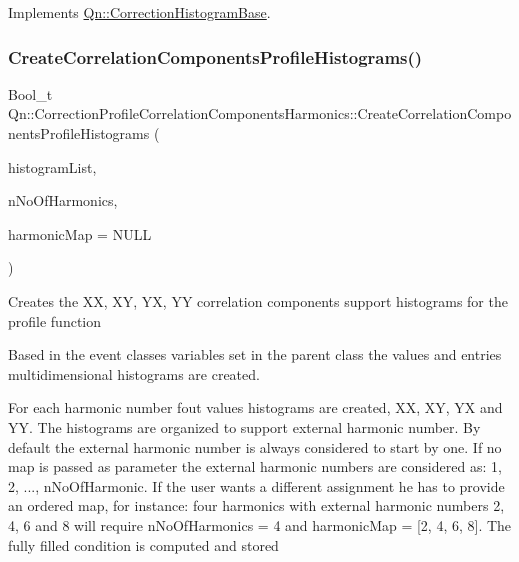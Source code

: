 Implements \mbox{\hyperlink{classQn_1_1CorrectionHistogramBase_a4db2c92ceaffefaa91475a721612d80d}{Qn\+::\+Correction\+Histogram\+Base}}.

\mbox{\label{classQn_1_1CorrectionProfileCorrelationComponentsHarmonics_a397aabf8866ef1056d04198a55a9d660}} 
\subsubsection{\texorpdfstring{Create\+Correlation\+Components\+Profile\+Histograms()}{CreateCorrelationComponentsProfileHistograms()}}
{\footnotesize\ttfamily Bool\+\_\+t Qn\+::\+Correction\+Profile\+Correlation\+Components\+Harmonics\+::\+Create\+Correlation\+Components\+Profile\+Histograms (\begin{DoxyParamCaption}\item[{T\+List $\ast$}]{histogram\+List,  }\item[{Int\+\_\+t}]{n\+No\+Of\+Harmonics,  }\item[{Int\+\_\+t $\ast$}]{harmonic\+Map = {\ttfamily NULL} }\end{DoxyParamCaption})}

Creates the XX, XY, YX, YY correlation components support histograms for the profile function

Based in the event classes variables set in the parent class the values and entries multidimensional histograms are created.

For each harmonic number fout values histograms are created, XX, XY, YX and YY. The histograms are organized to support external harmonic number. By default the external harmonic number is always considered to start by one. If no map is passed as parameter the external harmonic numbers are considered as\+: 1, 2, ..., n\+No\+Of\+Harmonic. If the user wants a different assignment he has to provide an ordered map, for instance\+: four harmonics with external harmonic numbers 2, 4, 6 and 8 will require n\+No\+Of\+Harmonics = 4 and harmonic\+Map = \mbox{[}2, 4, 6, 8\mbox{]}. The fully filled condition is computed and stored

